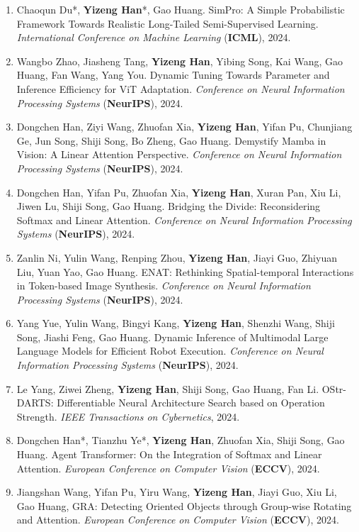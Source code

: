 \documentclass[10.5pt]{article}
\makeatletter
\newlength{\bibhang}
\newlength{\bibsep}
 {\@listi \global\bibsep\itemsep \global\advance\bibsep by\parsep}
\newenvironment{bibsection}%
        {\begin{enumerate}{%
       \setlength{\leftmargin}{-2em}%
       \setlength{\itemindent}{-2em}%
       \setlength{\itemsep}{\bibsep}%
        \setlength{\partopsep}{0pt}%
        \setlength{\topsep}{0pt}}}
        {\end{enumerate}\vspace{-.6\baselineskip}}
\makeatother
\begin{document}
\begin{sloppypar}
\begin{bibsection}
        \item Chaoqun Du*, \textbf{Yizeng Han}*, Gao Huang. SimPro: A Simple Probabilistic Framework Towards Realistic Long-Tailed Semi-Supervised Learning. \emph{International Conference on Machine Learning} (\textbf{ICML}), 2024.
        \item Wangbo Zhao, Jiasheng Tang, \textbf{Yizeng Han}, Yibing Song, Kai Wang, Gao Huang, Fan Wang, Yang You. Dynamic Tuning Towards Parameter and Inference Efficiency for ViT Adaptation. \emph{Conference on Neural Information Processing Systems} (\textbf{NeurIPS}), 2024.
        \item Dongchen Han, Ziyi Wang, Zhuofan Xia, \textbf{Yizeng Han}, Yifan Pu, Chunjiang Ge, Jun Song, Shiji Song, Bo Zheng, Gao Huang. Demystify Mamba in Vision: A Linear Attention Perspective. \emph{Conference on Neural Information Processing Systems} (\textbf{NeurIPS}), 2024.
        \item Dongchen Han, Yifan Pu, Zhuofan Xia, \textbf{Yizeng Han}, Xuran Pan, Xiu Li, Jiwen Lu, Shiji Song, Gao Huang. Bridging the Divide: Reconsidering Softmax and Linear Attention. \emph{Conference on Neural Information Processing Systems} (\textbf{NeurIPS}), 2024.
        \item Zanlin Ni, Yulin Wang, Renping Zhou, \textbf{Yizeng Han}, Jiayi Guo, Zhiyuan Liu, Yuan Yao, Gao Huang. ENAT: Rethinking Spatial-temporal Interactions in Token-based Image Synthesis. \emph{Conference on Neural Information Processing Systems} (\textbf{NeurIPS}), 2024.
        \item Yang Yue, Yulin Wang, Bingyi Kang, \textbf{Yizeng Han}, Shenzhi Wang, Shiji Song, Jiashi Feng, Gao Huang. Dynamic Inference of Multimodal Large Language Models for Efficient Robot Execution.  \emph{Conference on Neural Information Processing Systems} (\textbf{NeurIPS}), 2024.
        \item Le Yang, Ziwei Zheng, \textbf{Yizeng Han}, Shiji Song, Gao Huang, Fan Li. OStr-DARTS: Differentiable Neural Architecture Search based on Operation Strength. \emph{IEEE Transactions on Cybernetics}, 2024.
        \item Dongchen Han*, Tianzhu Ye*, \textbf{Yizeng Han}, Zhuofan Xia, Shiji Song, Gao Huang. Agent Transformer: On the Integration of Softmax and Linear Attention. \emph{European Conference on Computer Vision} (\textbf{ECCV}), 2024.
        \item Jiangshan Wang, Yifan Pu, Yiru Wang, \textbf{Yizeng Han}, Jiayi Guo, Xiu Li, Gao Huang, GRA: Detecting Oriented Objects through Group-wise Rotating and Attention. \emph{European Conference on Computer Vision} (\textbf{ECCV}), 2024.

\end{bibsection}
\end{sloppypar}
\end{document}
